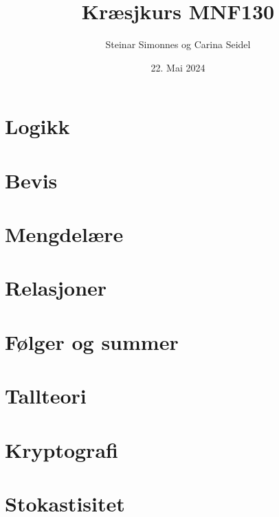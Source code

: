 \documentclass[aspectratio=169,fleqn,handout,xcolor={dvipsnames}]{beamer}
\author[ls]{Steinar Simonnes og Carina Seidel}
\title[sgp]{Kræsjkurs MNF130}
\institute{Institutt for Informatikk \\ Universitetet i Bergen}
\date[22.05.24]{22. Mai 2024}
\begin{document}


\section{Logikk}




\section{Bevis}




\section{Mengdelære}





\section{Relasjoner}






\section{Følger og summer}


\section{Tallteori}





\section{Kryptografi}




\section{Stokastisitet}



\end{document}
